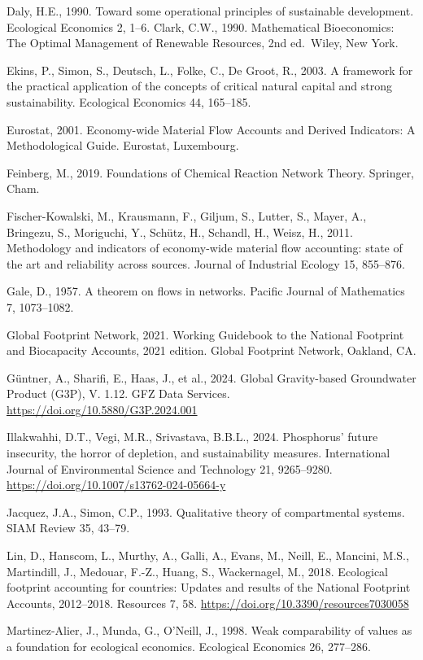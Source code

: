 \documentclass[11pt]{article}
\begin{document}
Daly, H.E., 1990. Toward some operational principles of sustainable
development. Ecological Economics 2, 1--6. Clark, C.W., 1990.
Mathematical Bioeconomics: The Optimal Management of Renewable
Resources, 2nd ed.~Wiley, New York.

Ekins, P., Simon, S., Deutsch, L., Folke, C., De Groot, R., 2003. A
framework for the practical application of the concepts of critical
natural capital and strong sustainability. Ecological Economics 44,
165--185.

Eurostat, 2001. Economy-wide Material Flow Accounts and Derived
Indicators: A Methodological Guide. Eurostat, Luxembourg.

Feinberg, M., 2019. Foundations of Chemical Reaction Network Theory.
Springer, Cham.

Fischer-Kowalski, M., Krausmann, F., Giljum, S., Lutter, S., Mayer, A.,
Bringezu, S., Moriguchi, Y., Sch\"utz, H., Schandl, H., Weisz, H., 2011.
Methodology and indicators of economy-wide material flow accounting:
state of the art and reliability across sources. Journal of Industrial
Ecology 15, 855--876.

Gale, D., 1957. A theorem on flows in networks. Pacific Journal of Mathematics 7, 1073--1082.

Global Footprint Network, 2021. Working Guidebook to the National Footprint and Biocapacity Accounts, 2021 edition. Global Footprint Network, Oakland, CA.

G\"untner, A., Sharifi, E., Haas, J., et al., 2024. Global Gravity-based
Groundwater Product (G3P), V. 1.12. GFZ Data Services.
\url{https://doi.org/10.5880/G3P.2024.001}

Illakwahhi, D.T., Vegi, M.R., Srivastava, B.B.L., 2024. Phosphorus'
future insecurity, the horror of depletion, and sustainability measures.
International Journal of Environmental Science and Technology 21,
9265--9280. \url{https://doi.org/10.1007/s13762-024-05664-y}

Jacquez, J.A., Simon, C.P., 1993. Qualitative theory of compartmental
systems. SIAM Review 35, 43--79.

Lin, D., Hanscom, L., Murthy, A., Galli, A., Evans, M., Neill, E.,
Mancini, M.S., Martindill, J., Medouar, F.-Z., Huang, S., Wackernagel,
M., 2018. Ecological footprint accounting for countries: Updates and
results of the National Footprint Accounts, 2012--2018. Resources 7, 58.
\url{https://doi.org/10.3390/resources7030058}

Martinez-Alier, J., Munda, G., O'Neill, J., 1998. Weak comparability of
values as a foundation for ecological economics. Ecological Economics
26, 277--286.
\end{document}
